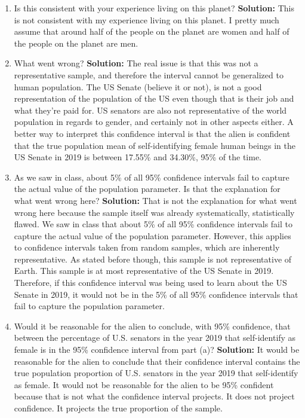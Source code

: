 \documentclass{article}
\begin{document}
\begin{enumerate}
\begin{enumerate}
\newline
\item Is this consistent with your experience living on this planet?
\newline
\textbf{Solution:}
\newline
This is not consistent with my experience living on this planet. I pretty much assume that around half of the people on the planet are women and half of the people on the planet are men. 
\newline
\item What went wrong?
\newline
\textbf{Solution:}
\newline
The real issue is that this was not a representative sample, and therefore the interval cannot be generalized to human population. The US Senate (believe it or not), is not a good representation of the population of the US even though that is their job and what they're paid for. US senators are also not representative of the world population in regards to gender, and certainly not in other aspects either. A better way to interpret this confidence interval is that the alien is confident that the true population mean of self-identifying female human beings in the US Senate in 2019 is between 17.55\% and 34.30\%, 95\% of the time.
\item As we saw in class, about 5\% of all 95\% confidence intervals fail 
to capture the actual value of the population parameter. Is that the explanation for what went wrong here? 
\newline
\textbf{Solution:}
\newline
That is not the explanation for what went wrong here because the sample itself was already systematically, statistically flawed. We saw in class that about 5\% of all 95\% confidence intervals fail to capture the actual value of the population parameter. However, this applies to confidence intervals taken from random samples, which are inherently representative. As stated before though, this sample is not representative of Earth. This sample is at most representative of the US Senate in 2019. Therefore, if this confidence interval was being used to learn about the US Senate in 2019, it would not be in the 5\% of all 95\% confidence intervals that fail to capture the population parameter. 
\item Would it be reasonable for the alien to conclude, with 95\% confidence, that between 
the percentage of U.S. senators in the year 2019 that self-identify as female is in the
95\% confidence interval from part (a)?
\newline
\textbf{Solution:}
\newline
It would be reasonable for the alien to conclude that their confidence interval contains the true population proportion of U.S. senators in the year 2019 that self-identify as female. It would not be reasonable for the alien to be 95\% confident because that is not what the confidence interval projects. It does not project confidence. It projects the true proportion of the sample. 
\end{enumerate}


\end{enumerate}
\end{document}
